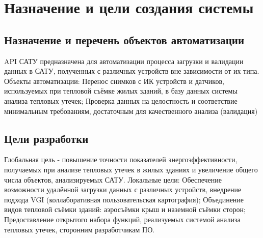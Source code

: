 \chapter{\enskip Назначение и цели создания системы}

\section{\enskip \nohyphens{Назначение и перечень объектов автоматизации}}
	API САТУ предназначена для автоматизации процесса загрузки и валидации данных в САТУ, полученных с различных устройств вне зависимости от их типа.
	Объекты автоматизации: 
	Перенос снимков с ИК устройств и датчиков, используемых при тепловой съёмке жилых зданий, в базу данных системы анализа тепловых утечек;
	Проверка данных на целостность и соответствие минимальным требованиям, достаточным для качественного анализа (валидация)

\section{\enskip Цели разработки}
	Глобальная цель - повышение точности показателей энергоэффективности, получаемых при анализе тепловых утечек в жилых зданиях и увеличение общего числа объектов, анализируемых САТУ.
	Локальные цели:
Обеспечение возможности удалённой загрузки данных с различных устройств, внедрение подхода VGI (коллаборативная пользовательская картография);
Объединение видов тепловой съёмки зданий: аэросъёмки крыш и наземной съёмки сторон;
Предоставление открытого набора функций, реализуемых системой анализа тепловых утечек, сторонним разработчикам ПО.